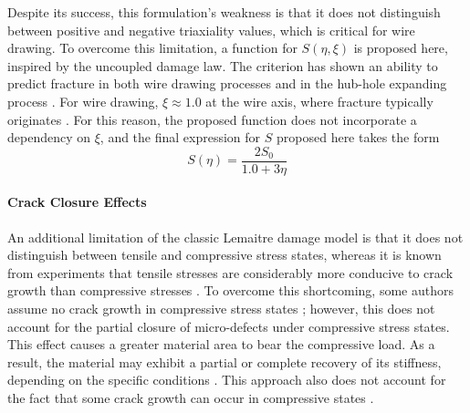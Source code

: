 \documentclass[sn-mathphys,Numbered]{sn-jnl}%
\begin{document}
Despite its success, this formulation's weakness is that it does not distinguish between positive and negative triaxiality values, which is critical for wire drawing.
To overcome this limitation, a function for $S(\eta,\xi)$ is proposed here, inspired by the \citet{ko_prediction_2007} uncoupled damage law.
The \citet{ko_prediction_2007} criterion has shown an ability to predict fracture in both wire drawing processes \cite{roh_process_2021} and in the hub-hole expanding process \cite{ko_prediction_2007}.
For wire drawing, $\xi\approx1.0$ at the wire axis, where fracture typically originates \cite{roh_process_2021}.
For this reason, the proposed function does not incorporate a dependency on $\xi$, and the final expression for $S$ proposed here takes the form
\begin{equation} \label{eqn:proposedLemaitre}
	S(\eta) = \frac{2S_0}{1.0+3\eta}
\end{equation}




\paragraph{Crack Closure Effects}

An additional limitation of the classic Lemaitre damage model is that it does not distinguish between tensile and compressive stress states, whereas it is known from experiments that tensile stresses are considerably more conducive to crack growth than compressive stresses \cite{bao_cut-off_2005}.
To overcome this shortcoming, some authors assume no crack growth in compressive stress states \cite{chu_void_1980}; however, this does not account for the partial closure of micro-defects under compressive stress states.
This effect causes a greater material area to bear the compressive load.
As a result, the material may exhibit a partial or complete recovery of its stiffness, depending on the specific conditions \cite{teixeira_ductile_2010}.
This approach also does not account for the fact that some crack growth can occur in compressive states \cite{basic_finite_2005}.
\end{document}
